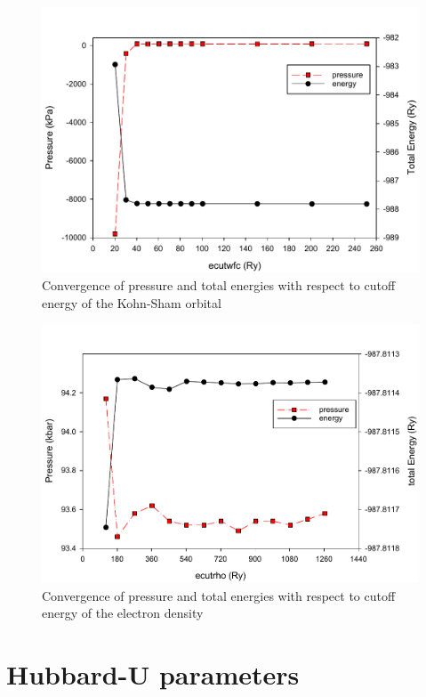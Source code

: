 \begin{figure}[tbh!]
	\centering
	\includegraphics[width=0.8\linewidth]{"images/rnd/ecutwfc"}
	\caption[Convergence of pressure and total energies with respect to cutoff energy of the Kohn-Sham orbital]{Convergence of pressure and total energies with respect to cutoff energy of the Kohn-Sham orbital}
\end{figure}

\begin{figure}[tbh!]
	\centering
	\includegraphics[width=0.8\linewidth]{"images/rnd/ecutrho"}
	\caption[Convergence of pressure and total energies with respect to cutoff energy of the electron density]{Convergence of pressure and total energies with respect to cutoff energy of the electron density}
\end{figure}

\section{Hubbard-U parameters}
